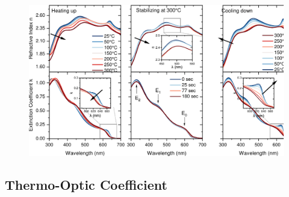 \begin{figure}
  \centering
  \medskip
  \includegraphics[width=.99\textwidth]{chapters/ellipsometry/image/Optical_constants.pdf}
  \caption{}
  \label{fig:ellipsometry:optical_constants}
\end{figure}


\subsection{Thermo-Optic Coefficient}

